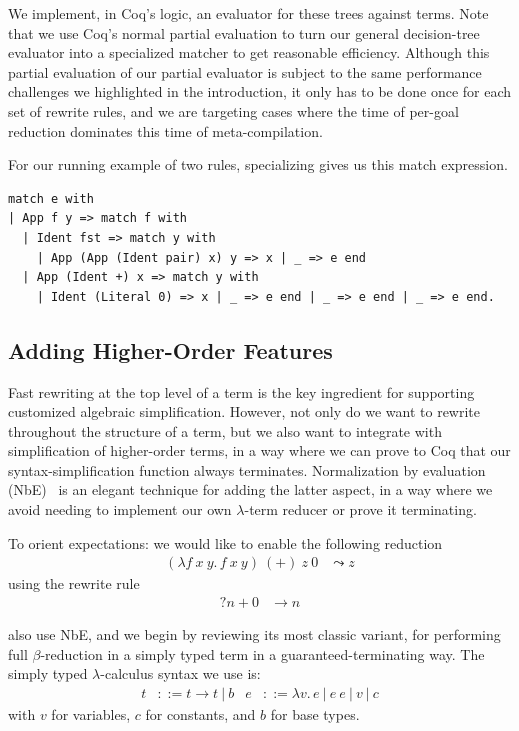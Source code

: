 We implement, in Coq's logic, an evaluator for these trees against terms.
Note that we use Coq's normal partial evaluation to turn our general decision-tree evaluator into a specialized matcher to get reasonable efficiency.
Although this partial evaluation of our partial evaluator is subject to the same performance challenges we highlighted in the introduction, it only has to be done once for each set of rewrite rules, and we are targeting cases where the time of per-goal reduction dominates this time of meta-compilation.

For our running example of two rules, specializing gives us this match expression.
\begin{verbatim}
match e with
| App f y => match f with
  | Ident fst => match y with
    | App (App (Ident pair) x) y => x | _ => e end
  | App (Ident +) x => match y with
    | Ident (Literal 0) => x | _ => e end | _ => e end | _ => e end.
\end{verbatim}

\subsection{Adding Higher-Order Features}\label{sec:thunk-eval-subst-term}

Fast rewriting at the top level of a term is the key ingredient for supporting customized algebraic simplification.
However, not only do we want to rewrite throughout the structure of a term, but we also want to integrate with simplification of higher-order terms, in a way where we can prove to Coq that our syntax-simplification function always terminates.
Normalization by evaluation (NbE)~\cite{NbE} is an elegant technique for adding the latter aspect, in a way where we avoid needing to implement our own $\lambda$-term reducer or prove it terminating.

To orient expectations: we would like to enable the following reduction
\begin{align*}
  (\lambda f\ x\ y.\, f\ x\ y)\ (+)\ z\ 0 & \leadsto z
\end{align*}
\noindent using the rewrite rule
\begin{align*}
  ?n + 0 & \to n
\end{align*}

\textcite{Aehlig} also use NbE, and we begin by reviewing its most classic variant, for performing full $\beta$-reduction in a simply typed term in a guaranteed-terminating way.
The simply typed $\lambda$-calculus syntax we use is:
\begin{align*}
  t & ::= t \to t ~|~ b
  & e & ::= \lambda v.\, e ~|~ e~e ~|~ v ~|~ c
\end{align*}
\noindent with $v$ for variables, $c$ for constants, and $b$ for base types.

